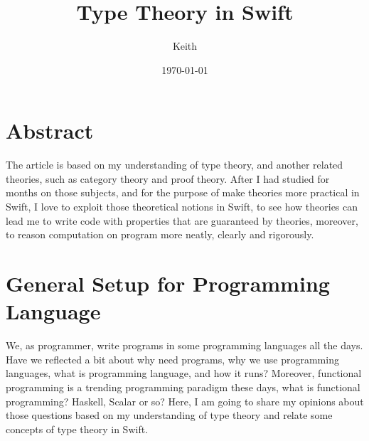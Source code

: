 \documentclass{article}
\title{Type Theory in Swift}
\author{Keith}
\date{\today}
\begin{document}

\maketitle

\tableofcontents

\newpage

\section{Abstract}
The article is based on my understanding of type theory, and another related theories, such as category theory and proof theory. After I had studied for months on those subjects, and for the purpose of make theories more practical in Swift, I love to exploit those theoretical notions in Swift, to see how theories can lead me to write code with properties that are guaranteed by theories, moreover, to reason computation on program more neatly, clearly and rigorously.

\section{General Setup for Programming Language}
We, as programmer, write programs in some programming languages all the days. Have we reflected a bit about why need programs, why we use programming languages, what is programming language, and how it runs? Moreover, functional programming is a trending programming paradigm these days, what is functional programming? Haskell, Scalar or so? Here, I am going to share my opinions about those questions based on my understanding of type theory and relate some concepts of type theory in Swift.
\end{document}
